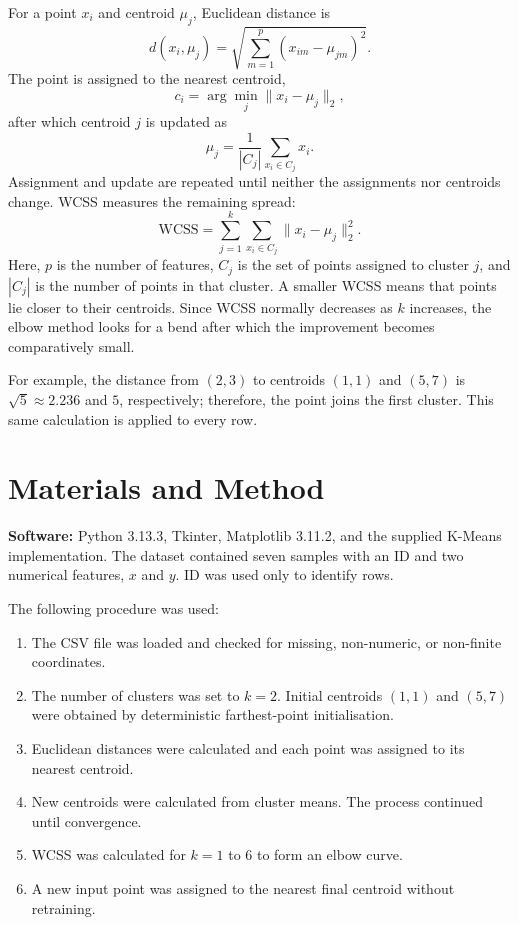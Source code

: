 \documentclass[12pt,a4paper]{report}
\begin{document}
For a point $x_i$ and centroid $\mu_j$, Euclidean distance is
\begin{equation}
d(x_i,\mu_j)=\sqrt{\sum_{m=1}^{p}(x_{im}-\mu_{jm})^2}.
\end{equation}
The point is assigned to the nearest centroid,
\begin{equation}
c_i=\arg\min_j \lVert x_i-\mu_j\rVert_2,
\end{equation}
after which centroid $j$ is updated as
\begin{equation}
\mu_j=\frac{1}{|C_j|}\sum_{x_i\in C_j}x_i.
\end{equation}
Assignment and update are repeated until neither the assignments nor centroids change. WCSS measures the remaining spread:
\begin{equation}
\mathrm{WCSS}=\sum_{j=1}^{k}\sum_{x_i\in C_j}\lVert x_i-\mu_j\rVert_2^2.
\end{equation}
Here, $p$ is the number of features, $C_j$ is the set of points assigned to cluster $j$, and $|C_j|$ is the number of points in that cluster. A smaller WCSS means that points lie closer to their centroids. Since WCSS normally decreases as $k$ increases, the elbow method looks for a bend after which the improvement becomes comparatively small.

For example, the distance from $(2,3)$ to centroids $(1,1)$ and $(5,7)$ is $\sqrt5\approx2.236$ and $5$, respectively; therefore, the point joins the first cluster. This same calculation is applied to every row.

\section{Materials and Method}
\textbf{Software:} Python 3.13.3, Tkinter, Matplotlib 3.11.2, and the supplied K-Means implementation. The dataset contained seven samples with an ID and two numerical features, $x$ and $y$. ID was used only to identify rows.

The following procedure was used:
\begin{enumerate}
\item The CSV file was loaded and checked for missing, non-numeric, or non-finite coordinates.
\item The number of clusters was set to $k=2$. Initial centroids $(1,1)$ and $(5,7)$ were obtained by deterministic farthest-point initialisation.
\item Euclidean distances were calculated and each point was assigned to its nearest centroid.
\item New centroids were calculated from cluster means. The process continued until convergence.
\item WCSS was calculated for $k=1$ to $6$ to form an elbow curve.
\item A new input point was assigned to the nearest final centroid without retraining.
\end{enumerate}
\end{document}
